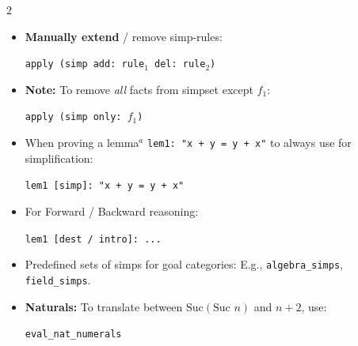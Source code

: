 \documentclass[9pt,a4paper]{extarticle}
\begin{document}
\begin{multicols*}{2}
\begin{tcolorbox}[title=1. Simplification (\texttt{simp})]
\begin{itemize}[leftmargin=1em, itemsep=1.5pt]
    \item \textbf{Manually extend} / remove simp-rules:
    \begin{center}
    \vspace{-0.2em}
    \texttt{\footnotesize apply (simp add: rule$_1$ del: rule$_2$)}
    \vspace{-0.2em}
    \end{center}
    
    \item \textbf{Note:} To remove \textit{all} facts from simpset except $f_1$:
    \begin{center}
    \vspace{-0.2em}
    \texttt{\footnotesize apply (simp only: $f_1$)}
    \vspace{-0.2em}
    \end{center}
\end{itemize}
\end{tcolorbox}

\vspace{-0.3em}

\begin{tcolorbox}[title=3. Useful Notes \& Attributes]
\begin{itemize}[leftmargin=1em, itemsep=1.5pt]
    \item When proving a lemma$^a$ \texttt{lem1: "x + y = y + x"} to always use for simplification:
    \begin{center}
    \vspace{-0.2em}
    \texttt{\footnotesize lem1 [simp]: "x + y = y + x"}
    \vspace{-0.2em}
    \end{center}
    
    \item For Forward / Backward reasoning:
    \begin{center}
    \vspace{-0.2em}
    \texttt{\footnotesize lem1 [dest / intro]: ...}
    \vspace{-0.2em}
    \end{center}
    
    \item Predefined sets of simps for goal categories: E.g., \texttt{algebra\_simps}, \texttt{field\_simps}.
    
    \item \textbf{Naturals:} To translate between $\text{Suc}(\text{Suc } n)$ and $n + 2$, use:
    \begin{center}
    \vspace{-0.2em}
    \texttt{\footnotesize eval\_nat\_numerals}
    \vspace{-0.2em}
    \end{center}
\end{itemize}
\end{tcolorbox}


\end{multicols*}
\end{document}
